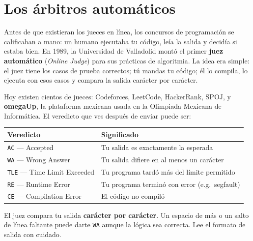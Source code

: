 \documentclass[12pt, oneside]{article}
\begin{document}

\tableofcontents
\newpage

\section{Los árbitros automáticos}

Antes de que existieran los jueces en línea, los concursos de programación se
calificaban a mano: un humano ejecutaba tu código, leía la salida y decidía si
estaba bien.  En 1989, la Universidad de Valladolid montó el primer
\textbf{juez automático} (\textit{Online Judge}) para sus prácticas de
algoritmia.  La idea era simple: el juez tiene los casos de prueba correctos;
tú mandas tu código; él lo compila, lo ejecuta con esos casos y compara la
salida carácter por carácter.

Hoy existen cientos de jueces: Codeforces, LeetCode, HackerRank, SPOJ,
y \textbf{omegaUp}, la plataforma mexicana usada en la Olimpiada Mexicana de
Informática.  El veredicto que ves después de enviar puede ser:

\begin{center}
\begin{tabular}{ll}
  \toprule
  \textbf{Veredicto} & \textbf{Significado} \\
  \midrule
  \texttt{AC} — Accepted            & Tu salida es exactamente la esperada \\
  \texttt{WA} — Wrong Answer        & Tu salida difiere en al menos un carácter \\
  \texttt{TLE} — Time Limit Exceeded & Tu programa tardó más del límite permitido \\
  \texttt{RE} — Runtime Error       & Tu programa terminó con error (e.g.\ segfault) \\
  \texttt{CE} — Compilation Error   & El código no compiló \\
  \bottomrule
\end{tabular}
\end{center}

\begin{advertencia}
  El juez compara tu salida \textbf{carácter por carácter}.  Un espacio
  de más o un salto de línea faltante puede darte \texttt{WA} aunque la
  lógica sea correcta.  Lee el formato de salida con cuidado.
\end{advertencia}
\end{document}
